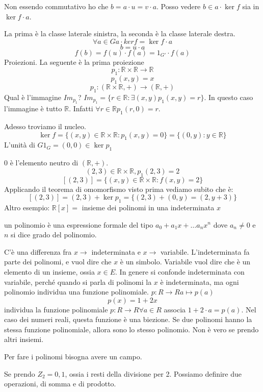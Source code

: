 Non essendo commutativo ho che $b = a \cdot u = v \cdot a$. Posso vedere $b \in a \cdot \ker f$ sia in $\ker f \cdot a$.

La prima \`e la classe laterale sinistra, la seconda \`e la classe laterale destra.
\[
\forall a \in G a \cdot ker f = \ker f \cdot a
\]
\[
b = u \cdot a
\]
\[
f(b) = f(u) \cdot f(a) = 1_{G'} \cdot f(a)
\]
Proiezioni. La seguente \`e la prima proiezione
\[
p_1 : \mathbb{R} \times \mathbb{R} \to \mathbb{R}
\]
\[
p_1 (x, y) = x
\]
\[
p_1 : (\mathbb{R} \times \mathbb{R}, +) \to (\mathbb{R}, +)
\]
Qual \`e l'immagine $Im_{p_1}$? $Im_{p_1} = \{ r \in \mathbb{R} : \exists (x, y) p_1 (x, y) = r \}$. In questo caso l'immagine \`e tutto $\mathbb{R}$. Infatti $\forall r \in \mathbb{R} p_1(r, 0) = r$.

Adesso troviamo il nucleo.
\[
\ker f = \{ (x, y) \in \mathbb{R} \times \mathbb{R} : p_1(x, y) = 0 \} = \{ (0, y) : y \in \mathbb{R} \}
\]
L'unit\`a di $G 1_G = (0, 0) \in \ker p_1$

0 \`e l'elemento neutro di $(\mathbb{R}, +)$.
\[
(2, 3) \in \mathbb{R} \times \mathbb{R}, p_1(2, 3) = 2
\]
\[
[(2, 3)] = \{ (x, y) \in \mathbb{R} \times \mathbb{R} : f(x, y) = 2\}
\]
Applicando il teorema di omomorfismo visto prima vediamo subito che \`e:
\[
[(2,3)] = (2, 3) + \ker p_1 = \{ (2, 3) + (0, y) = (2, y + 3) \}
\]
Altro esempio:
$\mathbb{R}[x] =$ insieme dei polinomi in una indeterminata $x$

un polinomio \`e una espressione formale del tipo $a_0 + a_1 x + \dots a_n x^n$ dove $a_n \neq 0$ e $n$ si dice grado del polinomio.

C'\`e una differenza fra $x \to$ indeterminata e $x \to $ variabile. L'indeterminata fa parte dei polinomi, e vuol dire che $x$ \`e un simbolo. Variabile vuol dire che \`e un elemento di un insieme, ossia $x \in E$. In genere si confonde indeterminata con variabile, perch\'e quando si parla di polinomi la $x$ \`e indeterminata, ma ogni polinomio individua una funzione polinomiale. $p : R \to R a \mapsto p(a)$
\[
p(x) = 1 + 2x
\]
individua la funzione polinomiale $p : R \to R \forall a \in R$ associa $1 + 2 \cdot a = p(a)$. Nel caso dei numeri reali, questa funzione \`e una biezione. Se due polinomi hanno la stessa funzione polinomiale, allora sono lo stesso polinomio. Non \`e vero se prendo altri insiemi.

Per fare i polinomi bisogna avere un campo.

Se prendo $Z_2 = {0,1}$, ossia i resti della divisione per 2. Possiamo definire due operazioni, di somma e di prodotto.

